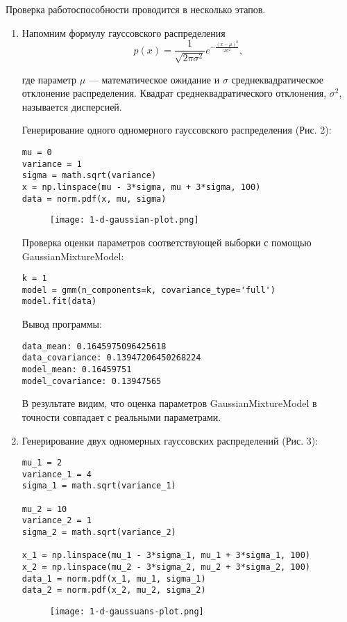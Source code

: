 Проверка работоспособности проводится в несколько этапов.

\begin{enumerate}
    \item {
        Напомним формулу гауссовского распределения
        $$ p(x) = \frac{1}{\sqrt{ 2 \pi \sigma^2 }} e^{ - \frac{ (x - \mu)^2 } {2 \sigma^2} },$$

        где параметр $\mu$ --- математическое ожидание и $\sigma$ среднеквадратическое отклонение распределения. Квадрат среднеквадратического отклонения, $\sigma^2$, называется дисперсией.

        Генерирование одного одномерного гауссовского распределения (Рис. 2):
        \begin{verbatim}
mu = 0
variance = 1
sigma = math.sqrt(variance)
x = np.linspace(mu - 3*sigma, mu + 3*sigma, 100)
data = norm.pdf(x, mu, sigma)
        \end{verbatim}
        \begin{figure}[h]
            \begin{center}
                \texttt{[image: 1-d-gaussian-plot.png]}
                \caption{}
                \label{ris:experimcoded}
            \end{center}
        \end{figure}

        Проверка оценки параметров соответствующей выборки с помощью GaussianMixtureModel:
        \begin{verbatim}
k = 1
model = gmm(n_components=k, covariance_type='full')
model.fit(data)
        \end{verbatim}

        Вывод программы:
        \begin{verbatim}
data_mean: 0.1645975096425618
data_covariance: 0.13947206450268224
model_mean: 0.16459751
model_covariance: 0.13947565
        \end{verbatim}

        В результате видим, что оценка параметров GaussianMixtureModel в точности совпадает с реальными параметрами.
    }
    \item {
        Генерирование двух одномерных гауссовских распределений (Рис. 3):
        \begin{verbatim}
mu_1 = 2
variance_1 = 4
sigma_1 = math.sqrt(variance_1)

mu_2 = 10
variance_2 = 1
sigma_2 = math.sqrt(variance_2)

x_1 = np.linspace(mu_1 - 3*sigma_1, mu_1 + 3*sigma_1, 100)
x_2 = np.linspace(mu_2 - 3*sigma_2, mu_2 + 3*sigma_2, 100)
data_1 = norm.pdf(x_1, mu_1, sigma_1)
data_2 = norm.pdf(x_2, mu_2, sigma_2)
        \end{verbatim}
        \begin{figure}[h]
            \begin{center}
                \texttt{[image: 1-d-gaussuans-plot.png]}
                \caption{}
                \label{ris:experimcoded}
            \end{center}
        \end{figure}

}
\end{enumerate}
